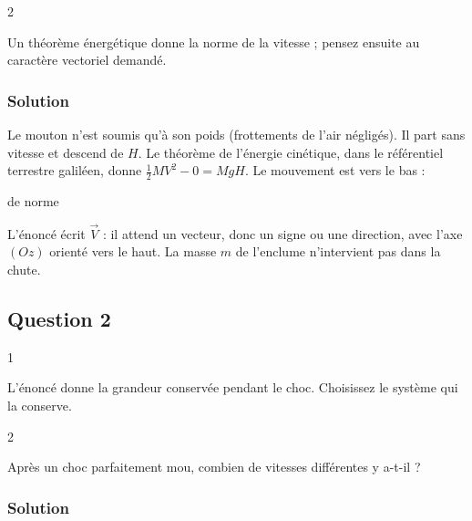\documentclass[11pt,a4paper]{article}
\newcommand{\equationajustee}[1]{%
  \sbox{\boiteequation}{$\displaystyle #1$}%
  \ifdim\wd\boiteequation>\linewidth
    \[\resizebox{\linewidth}{!}{\usebox{\boiteequation}}\]%
  \else
    \[#1\]%
  \fi}
\begin{document}
\begin{indication}{2}

Un théorème énergétique donne la norme de la vitesse ; pensez ensuite au caractère vectoriel demandé.

\end{indication}

\hypertarget{solution}{%
\subsubsection{Solution}\label{solution}}

Le mouton n'est soumis qu'à son poids (frottements de l'air négligés). Il part sans vitesse et descend de \(H\). Le théorème de l'énergie cinétique, dans le référentiel terrestre galiléen, donne \(\tfrac12MV^2 - 0 = MgH\). Le mouvement est vers le bas :

\equationajustee{\boxed{\vec V = -\sqrt{2gH}\,\vec e_z}}

de norme

\equationajustee{\boxed{V = \sqrt{2\times9{,}8\times0{,}50} = 3{,}1\ \mathrm{m\cdot s^{-1}}}}

\begin{piege}

L'énoncé écrit \(\vec V\) : il attend un vecteur, donc un signe ou une direction, avec l'axe \((Oz)\) orienté vers le haut. La masse \(m\) de l'enclume n'intervient pas dans la chute.

\end{piege}

\hypertarget{question-2}{%
\subsection{Question 2}\label{question-2}}

\begin{indication}{1}

L'énoncé donne la grandeur conservée pendant le choc. Choisissez le système qui la conserve.

\end{indication}

\begin{indication}{2}

Après un choc parfaitement mou, combien de vitesses différentes y a-t-il ?

\end{indication}

\hypertarget{solution-1}{%
\subsubsection{Solution}\label{solution-1}}
\end{document}
